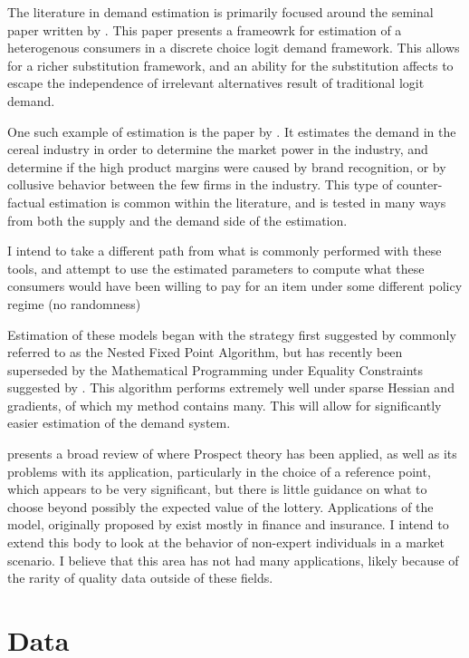 \documentclass[12pt]{paper}
\begin{document}
The literature in demand estimation is primarily focused around the
seminal paper written by \cite*{BLP}. This paper presents a frameowrk
for estimation of a heterogenous consumers in a discrete choice logit
demand framework. This allows for a richer substitution framework, and
an ability for the substitution affects to escape the independence of
irrelevant alternatives result of traditional logit demand.

One such example of estimation is the paper by \cite*{Cereal}. It
estimates the demand in the cereal industry in order to determine the
market power in the industry, and determine if the high product
margins were caused by brand recognition, or by collusive behavior
between the few firms in the industry. This type of counter-factual
estimation is common within the literature, and is tested in many ways
from both the supply and the demand side of the estimation.

I intend to take a different path from what is commonly performed with
these tools, and attempt to use the estimated parameters to compute
what these consumers would have been willing to pay for an item under
some different policy regime (no randomness)

Estimation of these models began with the strategy first suggested by
\cite{BLP} commonly referred to as the Nested Fixed Point Algorithm,
but has recently been superseded by the Mathematical Programming under
Equality Constraints suggested by \cite*{MPEC}. This algorithm
performs extremely well under sparse Hessian and gradients, of which
my method contains many. This will allow for significantly easier
estimation of the demand system.

\cite*{LitReview} presents a broad review of where Prospect theory has
been applied, as well as its problems with its application,
particularly in the choice of a reference point, which appears to be
very significant, but there is little guidance on what to choose
beyond possibly the expected value of the lottery. Applications of the
model, originally proposed by \cite*{Kahn} exist mostly in finance and
insurance. I intend to extend this body to look at the behavior of
non-expert individuals in a market scenario. I believe that this area
has not had many applications, likely because of the rarity of quality
data outside of these fields.



\section{Data}
\end{document}

